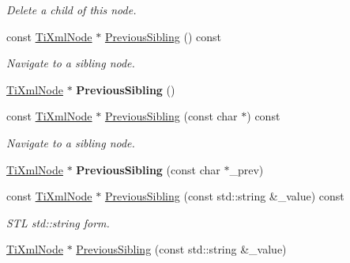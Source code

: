 \begin{DoxyCompactItemize}
\begin{DoxyCompactList}\small\item\em Delete a child of this node. \end{DoxyCompactList}\item 
const \hyperlink{class_ti_xml_node}{Ti\+Xml\+Node} $\ast$ \hyperlink{class_ti_xml_node_ac2cd892768726270e511b2ab32de4d10}{Previous\+Sibling} () const \hypertarget{class_ti_xml_node_ac2cd892768726270e511b2ab32de4d10}{}\label{class_ti_xml_node_ac2cd892768726270e511b2ab32de4d10}

\begin{DoxyCompactList}\small\item\em Navigate to a sibling node. \end{DoxyCompactList}\item 
\hyperlink{class_ti_xml_node}{Ti\+Xml\+Node} $\ast$ {\bfseries Previous\+Sibling} ()\hypertarget{class_ti_xml_node_af8c0642ad6ecc03f62953e68896ed1cc}{}\label{class_ti_xml_node_af8c0642ad6ecc03f62953e68896ed1cc}

\item 
const \hyperlink{class_ti_xml_node}{Ti\+Xml\+Node} $\ast$ \hyperlink{class_ti_xml_node_abbb3b8c1f38fa7b9e52d584a4aeca795}{Previous\+Sibling} (const char $\ast$) const \hypertarget{class_ti_xml_node_abbb3b8c1f38fa7b9e52d584a4aeca795}{}\label{class_ti_xml_node_abbb3b8c1f38fa7b9e52d584a4aeca795}

\begin{DoxyCompactList}\small\item\em Navigate to a sibling node. \end{DoxyCompactList}\item 
\hyperlink{class_ti_xml_node}{Ti\+Xml\+Node} $\ast$ {\bfseries Previous\+Sibling} (const char $\ast$\+\_\+prev)\hypertarget{class_ti_xml_node_a6c977049207177ef21b51972315c2053}{}\label{class_ti_xml_node_a6c977049207177ef21b51972315c2053}

\item 
const \hyperlink{class_ti_xml_node}{Ti\+Xml\+Node} $\ast$ \hyperlink{class_ti_xml_node_a658276f57d35d5d4256d1dc1a2c398ab}{Previous\+Sibling} (const std\+::string \&\+\_\+value) const \hypertarget{class_ti_xml_node_a658276f57d35d5d4256d1dc1a2c398ab}{}\label{class_ti_xml_node_a658276f57d35d5d4256d1dc1a2c398ab}

\begin{DoxyCompactList}\small\item\em S\+TL std\+::string form. \end{DoxyCompactList}\item 
\hyperlink{class_ti_xml_node}{Ti\+Xml\+Node} $\ast$ \hyperlink{class_ti_xml_node_acc8a0434c7f401d4a3b6dee77c1a5912}{Previous\+Sibling} (const std\+::string \&\+\_\+value)\hypertarget{class_ti_xml_node_acc8a0434c7f401d4a3b6dee77c1a5912}{}\label{class_ti_xml_node_acc8a0434c7f401d4a3b6dee77c1a5912}


\end{DoxyCompactItemize}
